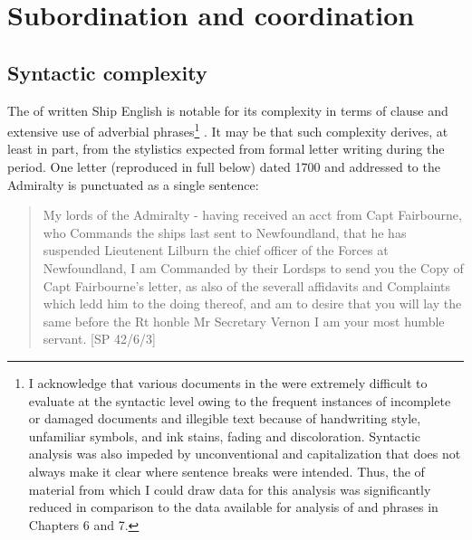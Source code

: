 \section{{Subordination and coordination}}%

\subsection{{Syntactic complexity}}%

The  of written Ship English is notable for its complexity in terms of clause  and extensive use of adverbial phrases\footnote{I acknowledge that various documents in the  were extremely difficult to evaluate at the syntactic level owing to the frequent instances of incomplete or damaged documents and illegible text because of handwriting style, unfamiliar symbols, and ink stains, fading and discoloration. Syntactic analysis was also impeded by unconventional  and capitalization that does not always make it clear where sentence breaks were intended. Thus, the  of material from which I could draw data for this analysis was significantly reduced in comparison to the data available for analysis of  and  phrases in Chapters 6 and 7.} . It may be that such complexity derives, at least in part, from the stylistics expected from formal letter writing during the period. One letter (reproduced in full below) dated 1700 and addressed to the Admiralty is punctuated as a single sentence: 

\begin{quotation}
My lords of the Admiralty - having received an acct from Capt Fairbourne, who Commands the ships last sent to Newfoundland, that he has suspended Lieutenent Lilburn the chief officer of the Forces at Newfoundland, I am Commanded by their Lordsps to send you the Copy of Capt Fairbourne’s letter, as also of the severall affidavits and Complaints which ledd him to the doing thereof, and am to desire that you will lay the same before the Rt honble Mr Secretary Vernon I am your most humble servant. [SP 42/6/3] 
\end{quotation}

